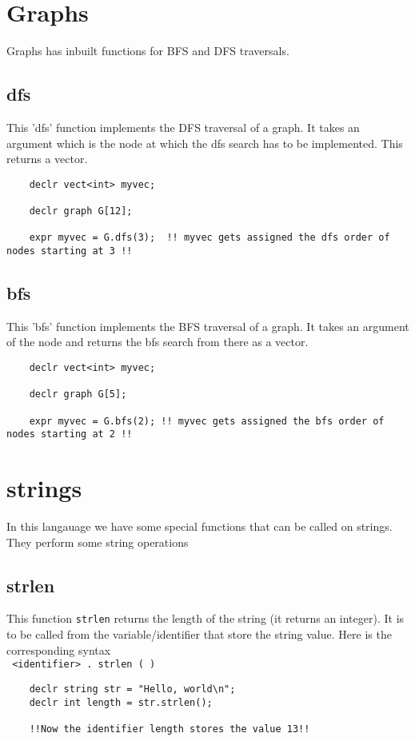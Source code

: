 \documentclass[journal, 18pt]{report}
\begin{document}
\section{Graphs}
Graphs has inbuilt functions for BFS and DFS traversals.
\subsection{dfs}
This 'dfs' function implements the DFS traversal of a graph. It takes an argument which is the node at which the dfs search has to be implemented. This returns a vector.\\
\begin{lstlisting}
    declr vect<int> myvec;
    
    declr graph G[12];
    
    expr myvec = G.dfs(3);  !! myvec gets assigned the dfs order of nodes starting at 3 !!
\end{lstlisting}
\subsection{bfs}
This 'bfs' function implements the BFS traversal of a graph. It takes an argument of the node and returns the bfs search from there as a vector.\\
\begin{lstlisting}
    declr vect<int> myvec;
    
    declr graph G[5];
    
    expr myvec = G.bfs(2); !! myvec gets assigned the bfs order of nodes starting at 2 !!
\end{lstlisting}

\section{strings}
In this langauage we have some special functions that can be called on strings. They perform some string operations

\subsection{strlen}
This function \texttt{strlen} returns the length of the string (it returns an integer). It is to be called from the variable/identifier that store the string value. Here is the corresponding syntax\\
\texttt{ <identifier> . strlen ( )}
\begin{lstlisting}
    declr string str = "Hello, world\n";
    declr int length = str.strlen();

    !!Now the identifier length stores the value 13!!
\end{lstlisting}
\end{document}
